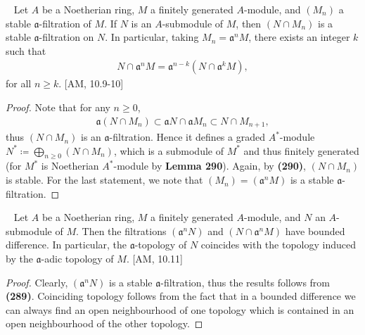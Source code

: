 \documentclass[12pt,a4paper,footinclude=true,headinclude=true]{scrbook} %
\newenvironment{theorem}[2][]
{\renewcommand\theinnercustomthm{#2}\innercustomthm[#1]
\begin{mdframed}[backgroundcolor=yellow!20]\ }
{\end{mdframed}\endinnercustomthm}
\newenvironment{proposition}[2][]
{\renewcommand\theinnercustomprop{#2}\innercustomprop[#1] 
\begin{mdframed}[backgroundcolor=gray!20]\ }
{\end{mdframed}\endinnercustomprop}
\begin{document}
\begin{proposition}{291. (Artin-Rees Lemma)}
    Let $A$ be a Noetherian ring, $M$ a finitely generated $A$-module, and $(M_n)$ a stable $\mathfrak{a}$-filtration of $M$. If $N$ is an $A$-submodule of $M$, then $(N\cap M_n)$ is a stable $\mathfrak{a}$-filtration on $N$.
    In particular, taking $M_n=\mathfrak{a}^nM$, there exists an integer $k$ such that
    \begin{align*}
        N\cap\mathfrak{a}^nM=\mathfrak{a}^{n-k}(N\cap\mathfrak{a}^kM),
    \end{align*}
    for all $n\geq k$. [AM, 10.9-10]
\end{proposition}
\begin{proof}
    Note that for any $n\geq0$,
    \begin{align*}
        \mathfrak{a}(N\cap M_n)\subset\mathfrak{a}N\cap\mathfrak{a}M_n\subset N\cap M_{n+1},
    \end{align*}
    thus $(N\cap M_n)$ is an $\mathfrak{a}$-filtration. Hence it defines a graded $A^\ast$-module $N^\ast\coloneqq\bigoplus_{n\geq0}(N\cap M_n)$, which is a submodule of $M^\ast$ and thus finitely generated (for $M^\ast$ is Noetherian $A^\ast$-module by \textbf{Lemma 290}). Again, by \textbf{(290)}, $(N\cap M_n)$ is stable. For the last statement, we note that $(M_n)=(\mathfrak{a}^nM)$ is a stable $\mathfrak{a}$-filtration.
\end{proof}
\newpage
\begin{theorem}{292}
    Let $A$ be a Noetherian ring, $M$ a finitely generated $A$-module, and $N$ an $A$-submodule of $M$. Then the filtrations $(\mathfrak{a}^nN)$ and $(N\cap\mathfrak{a}^nM)$ have bounded difference. In particular, the $\mathfrak{a}$-topology of $N$ coincides with the topology induced by the $\mathfrak{a}$-adic topology of $M$. [AM, 10.11]
\end{theorem}
\begin{proof}
    Clearly, $(\mathfrak{a}^nN)$ is a stable $\mathfrak{a}$-filtration, thus the results follows from \textbf{(289)}. Coinciding topology follows from the fact that in a bounded difference we can always find an open neighbourhood of one topology which is contained in an open neighbourhood of the other topology.
\end{proof}
\end{document}
